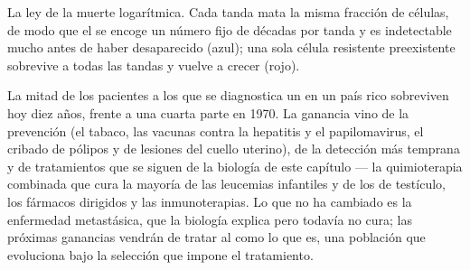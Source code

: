 \begin{omfigure}

{\small La ley de la muerte logarítmica. Cada tanda mata la misma
fracción de células, de modo que el  se encoge un número fijo de
décadas por tanda y es indetectable mucho antes de haber desaparecido
(azul); una sola célula resistente preexistente sobrevive a todas las
tandas y vuelve a crecer (rojo).}
\end{omfigure}

\begin{remark}\label{rem:b3:cancer-biology:changed}
La mitad de los pacientes a los que se diagnostica un  en un país
rico sobreviven hoy diez años, frente a una cuarta parte en 1970. La
ganancia vino de la prevención (el tabaco, las vacunas contra la
hepatitis y el papilomavirus, el cribado de pólipos y de lesiones del
cuello uterino), de la detección más temprana y de tratamientos que se
siguen de la biología de este capítulo --- la quimioterapia combinada que
cura la mayoría de las leucemias infantiles y de los  de
testículo, los fármacos dirigidos y las inmunoterapias. Lo que no ha
cambiado es la enfermedad metastásica, que la biología explica pero
todavía no cura; las próximas ganancias vendrán de tratar al  como
lo que es, una población que evoluciona bajo la selección que impone el
tratamiento.
\end{remark}

